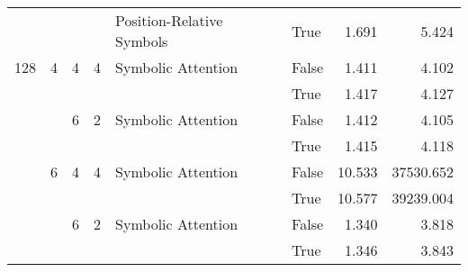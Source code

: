 \begin{tabular}{llllllrr}
    &   &   &   & Position-Relative Symbols & True  &     1.691 &           5.424 \\
128 & 4 & 4 & 4 & Symbolic Attention & False &     1.411 &           4.102 \\
    &   &   &   &                    & True  &     1.417 &           4.127 \\
    &   & 6 & 2 & Symbolic Attention & False &     1.412 &           4.105 \\
    &   &   &   &                    & True  &     1.415 &           4.118 \\
    & 6 & 4 & 4 & Symbolic Attention & False &    10.533 &       37530.652 \\
    &   &   &   &                    & True  &    10.577 &       39239.004 \\
    &   & 6 & 2 & Symbolic Attention & False &     1.340 &           3.818 \\
    &   &   &   &                    & True  &     1.346 &           3.843 \\
\bottomrule
\end{tabular}
